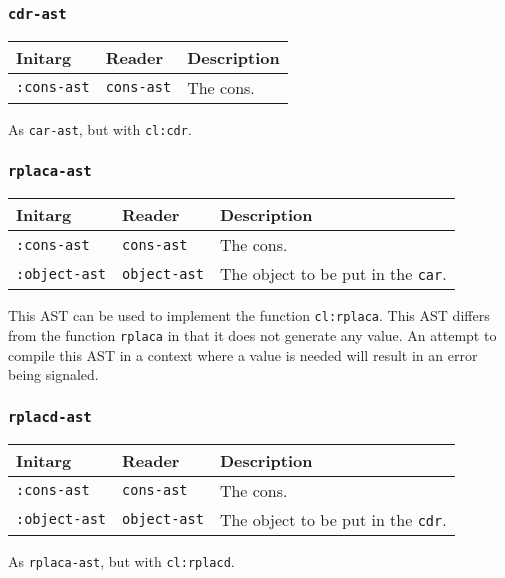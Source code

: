 \subsubsection{\texttt{cdr-ast}}
\label{sec-ast-cdr}

\begin{tabular}{|l|l|l|}
  \hline
  Initarg & Reader & Description\\
  \hline\hline
  \texttt{:cons-ast} & \texttt{cons-ast} & The cons.\\
  \hline
\end{tabular}

As \texttt{car-ast}, but with \texttt{cl:cdr}.

\subsubsection{\texttt{rplaca-ast}}
\label{sec-ast-rplaca}

\begin{tabular}{|l|l|l|}
  \hline
  Initarg & Reader & Description\\
  \hline\hline
  \texttt{:cons-ast} & \texttt{cons-ast} & The cons.\\
  \hline
  \texttt{:object-ast} & \texttt{object-ast} & The object to be put in the \texttt{car}.\\
  \hline
\end{tabular}

This AST can be used to implement the function \texttt{cl:rplaca}.
This AST differs from the function \texttt{rplaca} in that it does
not generate any value. An attempt to compile this AST in a context
where a value is needed will result in an error being signaled.

\subsubsection{\texttt{rplacd-ast}}
\label{sec-ast-rplacd}

\begin{tabular}{|l|l|l|}
  \hline
  Initarg & Reader & Description\\
  \hline\hline
  \texttt{:cons-ast} & \texttt{cons-ast} & The cons.\\
  \hline
  \texttt{:object-ast} & \texttt{object-ast} & The object to be put in the \texttt{cdr}.\\
  \hline
\end{tabular}

As \texttt{rplaca-ast}, but with \texttt{cl:rplacd}.

